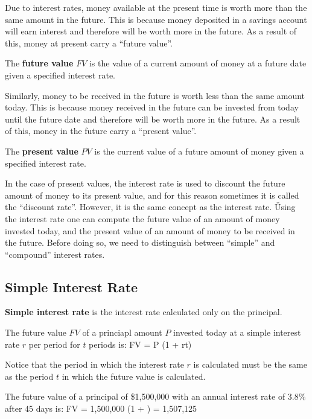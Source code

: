 Due to interest rates, money available at the present time is worth more than the same amount in the future. This is
because money deposited in a savings account will earn interest and therefore will be worth more in the future. As a
result of this, money at present carry a ``future value''.

The \textbf{future value} $FV$ is the value of a current amount of money at a future date given a specified interest
rate.
\ed

Similarly, money to be received in the future is worth less than the same amount today. This is because money received
in the future can be invested from today until the future date and therefore will be worth more in the future. As a
result of this, money in the future carry a ``present value''.

The \textbf{present value} $PV$ is the current value of a future amount of money given a specified interest rate.
\ed

In the case of present values, the interest rate is used to discount the future amount of money to its present value,
and for this reason sometimes it is called the ``discount rate''. However, it is the same concept as the interest
rate. \v

Using the interest rate one can compute the future value of an amount of money invested today, and the present value
of an amount of money to be received in the future. Before doing so, we need to distinguish between ``simple'' and
``compound'' interest rates.

\subsection{Simple Interest Rate}

\textbf{Simple interest rate} is the interest rate calculated only on the principal.
\ed

The future value $FV$ of a princiapl amount $P$ invested today at a simple interest rate $r$ per period for $t$ periods
is:
\bse
FV = P \cdot (1 + rt)
\ese

Notice that the period in which the interest rate $r$ is calculated must be the same as the period $t$ in which the
future value is calculated.

\be
The future value of a principal of \$1,500,000 with an annual interest rate of 3.8\% after 45 days is:
\bse
FV = 1,500,000 \cdot (1 +  ) = 1,507,125
\ese

